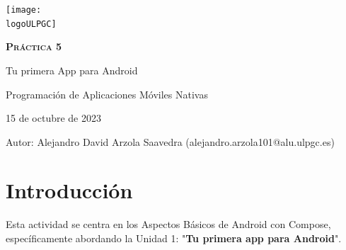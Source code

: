 \documentclass[a4paper]{article}
\newcommand{\dateToday}{15 de octubre de 2023}
\newcommand{\logoULPGC}{imagenes/ulpgc.png}
\newcommand{\android}{imagenes/android.png}
\begin{document}
    \begin{titlepage}
        \centering
        \vspace*{2cm}
        \texttt{[image: \\logoULPGC]}\par\vspace{1cm}
    
        {\scshape\textbf{\LARGE Práctica 5}}\par
        \vspace{0.6cm}
        {\bfseries}{\Huge Tu primera App para Android}
        \vspace{2cm}
    
        \centering
        
        \begin{tcolorbox}[colback=red!5!white,colframe=white!50!black]
            \centering \Large Programación de Aplicaciones Móviles Nativas \par
            \dateToday
        \end{tcolorbox}

        \vspace{1cm}        
        \begin{tcolorbox}[colback=blue!5!white,colframe=blue!75!black]
            Autor:
            \tcblower
            Alejandro David Arzola Saavedra (alejandro.arzola101@alu.ulpgc.es)
        \end{tcolorbox}
    \end{titlepage}
    
    \newpage
        
    \tableofcontents 
    
    \newpage

    \section{Introducción}

    Esta actividad se centra en los Aspectos Básicos de Android con Compose, específicamente abordando la Unidad 1: "\textbf{Tu primera app para Android}". \vspace{0.3cm}
    
\end{document}
